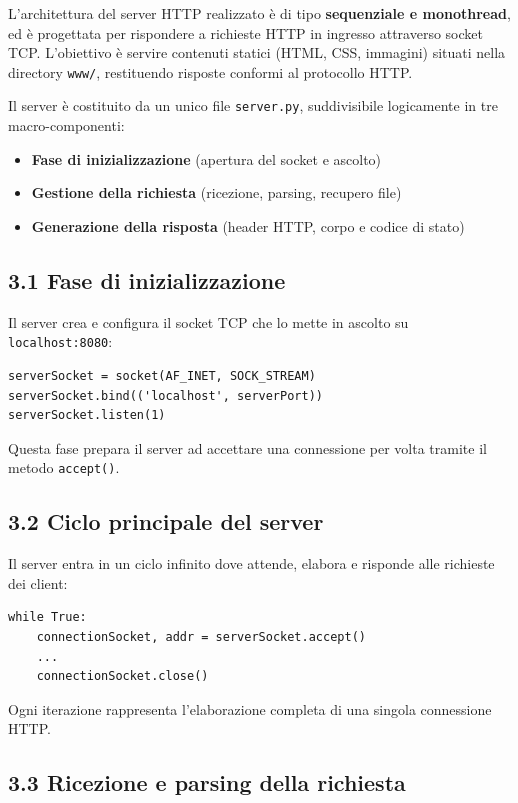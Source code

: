 \documentclass[a4paper,12pt]{report}
\begin{document}
L'architettura del server HTTP realizzato è di tipo \textbf{sequenziale e monothread}, ed è progettata per rispondere a richieste HTTP in ingresso attraverso socket TCP. L'obiettivo è servire contenuti statici (HTML, CSS, immagini) situati nella directory \texttt{www/}, restituendo risposte conformi al protocollo HTTP.

Il server è costituito da un unico file \texttt{server.py}, suddivisibile logicamente in tre macro-componenti:
\begin{itemize}
    \item \textbf{Fase di inizializzazione} (apertura del socket e ascolto)
    \item \textbf{Gestione della richiesta} (ricezione, parsing, recupero file)
    \item \textbf{Generazione della risposta} (header HTTP, corpo e codice di stato)
\end{itemize}

\subsection*{3.1 Fase di inizializzazione}

Il server crea e configura il socket TCP che lo mette in ascolto su \texttt{localhost:8080}:

\begin{verbatim}
serverSocket = socket(AF_INET, SOCK_STREAM)
serverSocket.bind(('localhost', serverPort))
serverSocket.listen(1)
\end{verbatim}

Questa fase prepara il server ad accettare una connessione per volta tramite il metodo \texttt{accept()}.

\newpage

\subsection*{3.2 Ciclo principale del server}

Il server entra in un ciclo infinito dove attende, elabora e risponde alle richieste dei client:

\begin{verbatim}
while True:
    connectionSocket, addr = serverSocket.accept()
    ...
    connectionSocket.close()
\end{verbatim}

Ogni iterazione rappresenta l’elaborazione completa di una singola connessione HTTP.


\subsection*{3.3 Ricezione e parsing della richiesta}
\end{document}

